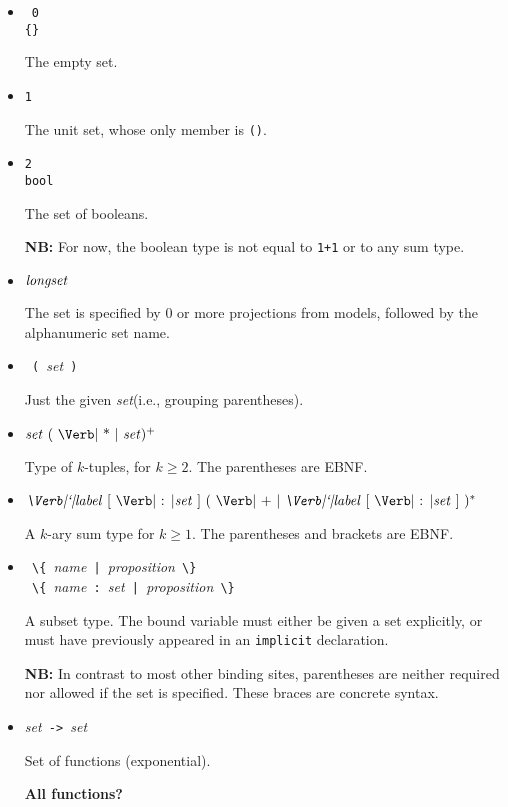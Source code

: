 \documentclass[12pt]{article}
\newcommand{\keywd}[1]{\mbox{\texttt{#1}}\xspace}
\newcommand{\IMPLICIT}{\keywd{implicit}}
\newcommand{\metav}[1]{\mbox{\textit{#1}}\xspace}
\newcommand{\Ident}{\metav{name}}
\newcommand{\Label}{\metav{\Verb|`|label}}
\newcommand{\Setexp}{\metav{set}}
\newcommand{\Proposition}{\metav{proposition}}
\newcommand{\ARROW}{\mbox{\Verb| -> |}}
\newcommand{\BAR}{\mbox{\Verb+ | +}}
\newcommand{\COLON}{\mbox{\Verb| : |}}
\newcommand{\LBRACE}{\mbox{\Verb| \{ |}}
\newcommand{\LPAREN}{\mbox{\Verb| ( |}}
\newcommand{\PLUS}{\mbox{\Verb| + |}}
\newcommand{\RBRACE}{\mbox{\Verb| \} |}}
\newcommand{\RPAREN}{\mbox{\Verb| ) |}}
\newcommand{\TIMES}{\mbox{\Verb| * |}}
\newcommand{\NB}{\textbf{NB: }}
\begin{document}
\begin{itemize}
\item \ \keywd{0}\\
      \Verb|{}|

  The empty set.

\item \keywd{1}

  The unit set, whose only member is \Verb|()|.

\item \keywd{2}\\
      \keywd{bool}

  The set of booleans.  

  \NB For now, the boolean type is not equal to 
  \Verb|1+1| or to any sum type.

\item $\metav{longset}$
  
  The set is specified by 0 or more projections from models, followed
  by the alphanumeric set name.

\item \LPAREN \Setexp \RPAREN

  Just the given \Setexp (i.e., grouping parentheses).

\item $\Setexp\ (\ \TIMES\ \Setexp )^{+}$

  Type of $k$-tuples, for $k\ge 2$.  The parentheses are EBNF.

\item $\Label\ [\ \COLON \Setexp\ ]\ (\ \PLUS\ \Label\ [\ \COLON \Setexp\ ]\ )^{*}$

  A $k$-ary sum type for $k\ge 1$.  The parentheses and brackets
  are EBNF.

\item \LBRACE \Ident \BAR \Proposition \RBRACE\\
      \LBRACE \Ident \COLON \Setexp \BAR \Proposition \RBRACE
      
      A subset type.  The bound variable must either be given a set
      explicitly, or must have previously appeared in an \IMPLICIT
      declaration.

  \NB In contrast to most other binding sites, parentheses are neither
  required nor allowed if the set is specified.  These braces are
  concrete syntax.

\item \Setexp \ARROW \Setexp

  Set of functions (exponential).

  \textbf{All functions?}


\end{itemize}
\end{document}
